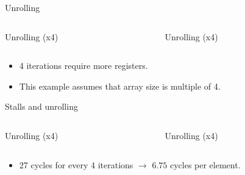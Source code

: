 \begin{frame}[t]{Unrolling}

\begin{columns}

\begin{column}{.45\textwidth}
\begin{block}{Unrolling (x4)}

\end{block}
\end{column}

\begin{column}{.45\textwidth}
\begin{block}{Unrolling (x4)}

\end{block}
\end{column}

\end{columns}
\begin{itemize}
  \item 4 iterations require more registers.
  \item This example assumes that array size is multiple of 4.
\end{itemize}
\end{frame}

\begin{frame}[t]{Stalls and unrolling}

\begin{columns}

\begin{column}{.45\textwidth}
\begin{block}{Unrolling (x4)}

\end{block}
\end{column}

\begin{column}{.45\textwidth}
\begin{block}{Unrolling (x4)}

\end{block}
\end{column}

\end{columns}
\begin{itemize}
  \item 27 cycles for every 4 iterations $\rightarrow$ $6.75$ cycles per element.
\end{itemize}
\end{frame}

